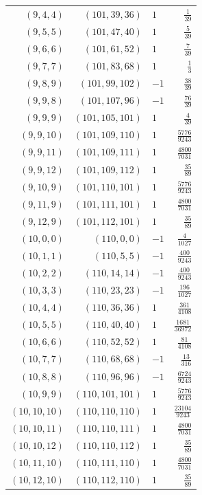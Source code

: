 \begin{longtable}{rrlr}
$(9,4,4)$ & $(101,39,36)$ & $1$ & $\frac{1}{39}$\\
$(9,5,5)$ & $(101,47,40)$ & $1$ & $\frac{5}{39}$\\
$(9,6,6)$ & $(101,61,52)$ & $1$ & $\frac{7}{39}$\\
$(9,7,7)$ & $(101,83,68)$ & $1$ & $\frac{1}{3}$\\
$(9,8,9)$ & $(101,99,102)$ & $-1$ & $\frac{38}{39}$\\
$(9,9,8)$ & $(101,107,96)$ & $-1$ & $\frac{76}{39}$\\
$(9,9,9)$ & $(101,105,101)$ & $1$ & $\frac{4}{39}$\\
$(9,9,10)$ & $(101,109,110)$ & $1$ & $\frac{5776}{9243}$\\
$(9,9,11)$ & $(101,109,111)$ & $1$ & $\frac{4800}{7031}$\\
$(9,9,12)$ & $(101,109,112)$ & $1$ & $\frac{35}{89}$\\
$(9,10,9)$ & $(101,110,101)$ & $1$ & $\frac{5776}{9243}$\\
$(9,11,9)$ & $(101,111,101)$ & $1$ & $\frac{4800}{7031}$\\
$(9,12,9)$ & $(101,112,101)$ & $1$ & $\frac{35}{89}$\\
$(10,0,0)$ & $(110,0,0)$ & $-1$ & $\frac{4}{1027}$\\
$(10,1,1)$ & $(110,5,5)$ & $-1$ & $\frac{400}{9243}$\\
$(10,2,2)$ & $(110,14,14)$ & $-1$ & $\frac{400}{9243}$\\
$(10,3,3)$ & $(110,23,23)$ & $-1$ & $\frac{196}{1027}$\\
$(10,4,4)$ & $(110,36,36)$ & $1$ & $\frac{361}{4108}$\\
$(10,5,5)$ & $(110,40,40)$ & $1$ & $\frac{1681}{36972}$\\
$(10,6,6)$ & $(110,52,52)$ & $1$ & $\frac{81}{4108}$\\
$(10,7,7)$ & $(110,68,68)$ & $-1$ & $\frac{13}{316}$\\
$(10,8,8)$ & $(110,96,96)$ & $-1$ & $\frac{6724}{9243}$\\
$(10,9,9)$ & $(110,101,101)$ & $1$ & $\frac{5776}{9243}$\\
$(10,10,10)$ & $(110,110,110)$ & $1$ & $\frac{23104}{9243}$\\
$(10,10,11)$ & $(110,110,111)$ & $1$ & $\frac{4800}{7031}$\\
$(10,10,12)$ & $(110,110,112)$ & $1$ & $\frac{35}{89}$\\
$(10,11,10)$ & $(110,111,110)$ & $1$ & $\frac{4800}{7031}$\\
$(10,12,10)$ & $(110,112,110)$ & $1$ & $\frac{35}{89}$\\

\end{longtable}
